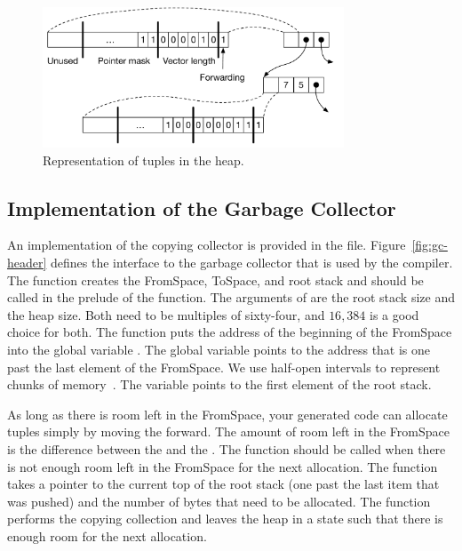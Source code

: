 \documentclass[7x10]{TimesAPriori_MIT}%
\numberwithin{theorem}{chapter}
\numberwithin{definition}{chapter}
\numberwithin{equation}{chapter}
\begin{document}
\begin{figure}[tbp]
  \centering
  \begin{tcolorbox}[colback=white]
    \includegraphics[width=0.8\textwidth]{figs/tuple-rep}
  \end{tcolorbox}
  \caption{Representation of tuples in the heap.}
\label{fig:tuple-rep}
\end{figure}

\subsection{Implementation of the Garbage Collector}
\label{sec:organize-gz}

An implementation of the copying collector is provided in the
 file. Figure~\ref{fig:gc-header} defines the
interface to the garbage collector that is used by the compiler. The
 function creates the FromSpace, ToSpace, and root
stack and should be called in the prelude of the 
function. The arguments of  are the root stack size
and the heap size. Both need to be multiples of sixty-four, and $16,384$ is a
good choice for both.  The  function puts the address
of the beginning of the FromSpace into the global variable
. The global variable  points to
the address that is one past the last element of the FromSpace. We use
half-open intervals to represent chunks of
memory~\citep{Dijkstra:1982aa}.  The  variable
points to the first element of the root stack.

As long as there is room left in the FromSpace, your generated code
can allocate tuples simply by moving the  forward.
%
The amount of room left in the FromSpace is the difference between the
 and the .  The 
function should be called when there is not enough room left in the
FromSpace for the next allocation.  The  function takes
a pointer to the current top of the root stack (one past the last item
that was pushed) and the number of bytes that need to be
allocated. The  function performs the copying collection
and leaves the heap in a state such that there is enough room for the
next allocation.
\end{document}
